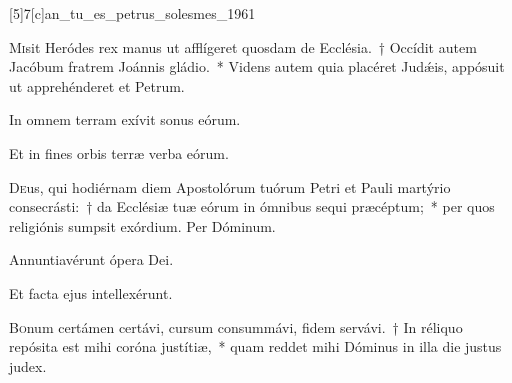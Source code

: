 \documentclass[vesperale_romanum.tex]{subfiles}
\begin{document}
[5]{7}[c]{an_tu_es_petrus_solesmes_1961}


\lettrine{M}{i}sit Heródes rex manus ut afflígeret quosdam de Ecclésia.~† Occídit autem Jacóbum fratrem Joánnis gládio.~* Videns autem quia placéret Judǽis, appósuit ut apprehénderet et Petrum.

\hymnus


\altertonus


 \vv In omnem terram exívit sonus eórum.
 
 \rr Et in fines orbis terræ verba eórum.

\label{an_tu_es_pastor_ovium_solesmes}


\oratio

\lettrine{D}{e}us, qui hodiérnam diem Apostolórum tuórum Petri et Pauli martýrio consecrásti:~† da Ecclésiæ tuæ eórum in ómnibus sequi præcéptum;~* per quos religiónis sumpsit exórdium.
Per Dóminum.






 \vv Annuntiavérunt ópera Dei.
 
 \rr Et facta ejus intellexérunt.
 



\lettrine{B}{o}num certámen certávi, cursum consummávi, fidem servávi.~† In réliquo repósita est mihi coróna justítiæ,~* quam reddet mihi Dóminus in illa die justus judex.
\end{document}
